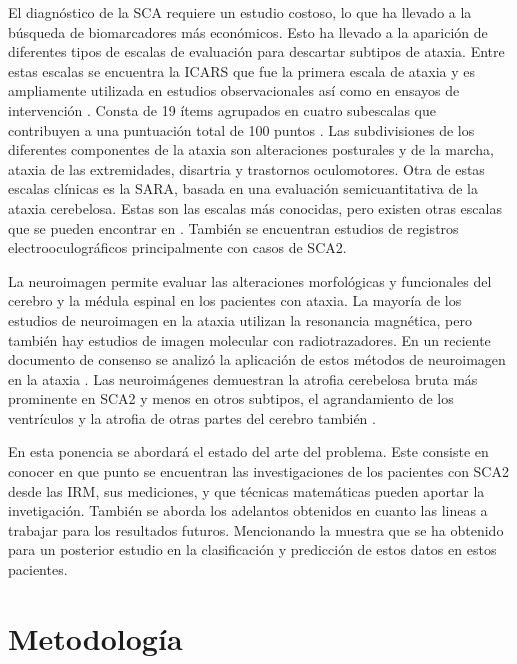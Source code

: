 \documentclass[a4paper,12pt]{article}
\begin{document}
El diagnóstico de la SCA requiere un estudio costoso, lo que ha llevado a la búsqueda de biomarcadores más económicos. Esto ha llevado a la aparición de diferentes tipos de escalas de evaluación para descartar subtipos de ataxia. Entre estas escalas se encuentra la ICARS que fue la primera escala de ataxia y es ampliamente utilizada en estudios observacionales así como en ensayos de intervención \cite{bhandari_spinocerebellar_2022}. Consta de 19 ítems agrupados en cuatro subescalas que contribuyen a una puntuación total de 100 puntos \cite{paap_standardized_2016}. Las subdivisiones de los diferentes componentes de la ataxia son alteraciones posturales y de la marcha, ataxia de las extremidades, disartria y trastornos oculomotores. Otra de estas escalas clínicas es la SARA, basada en una evaluación semicuantitativa de la ataxia cerebelosa. Estas son las escalas más conocidas, pero existen otras escalas que se pueden encontrar en \cite{silva_diagnosis_2019,muthuswamy_diagnosis_2013}. También se encuentran estudios de registros electrooculográficos principalmente con casos de SCA2.

La neuroimagen permite evaluar las alteraciones morfológicas y funcionales del cerebro y la médula espinal en los pacientes con ataxia. La mayoría de los estudios de neuroimagen en la ataxia utilizan la resonancia magnética, pero también hay estudios de imagen molecular con radiotrazadores. En un reciente documento de consenso se analizó la aplicación de estos métodos de neuroimagen en la ataxia \cite{oz_mr_2020,klaes_mr_2016,wan_mr_2020}.  Las neuroimágenes demuestran la atrofia cerebelosa bruta más prominente en SCA2 y menos en otros subtipos, el agrandamiento de los ventrículos y la atrofia de otras partes del cerebro también \cite{cocozza_conventional_2021,cabeza-ruiz_convolutional_2021,cabeza-ruiz_convolutional_2022,klaes_mr_2016,oz_mr_2020,mascalchi_neuroimaging_2020}. 

En esta ponencia  se abordará el estado del arte del problema. Este consiste en conocer en que punto se encuentran las investigaciones de los pacientes con SCA2 desde las IRM, sus mediciones, y que técnicas matemáticas pueden aportar la invetigación. También se aborda los adelantos obtenidos en cuanto las lineas a trabajar para los resultados futuros. Mencionando la muestra que se ha obtenido para un posterior estudio en la clasificación y predicción de estos datos en estos pacientes.       
	
\section{Metodología}
\end{document}
